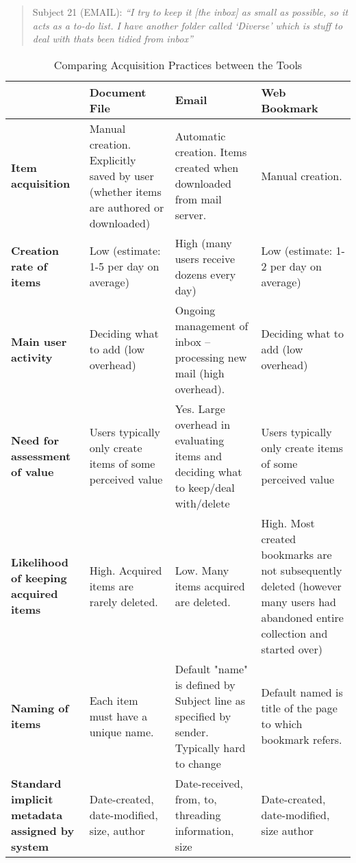 \begin{quote}
	Subject 21 (EMAIL): \textit{``I try to keep it [the inbox] as small as possible, so it acts as a to-do list. I have another folder called `Diverse' which is stuff to deal with thats been tidied from inbox''}
\end{quote}

\begin{table}[h]
\begin{center}
\begin{footnotesize}
\begin{tabular}{|p{2.5cm}|p{3.5cm}|p{3.5cm}|p{3.5cm}|}
\hline
    {\bf } & {\bf Document File} & {\bf Email} & {\bf Web Bookmark} \\
\hline \hline
{\bf Item acquisition} & Manual creation. Explicitly saved by user (whether items are authored or downloaded) & Automatic creation. Items created when downloaded from mail server.  & Manual creation. \\
\hline
{\bf Creation rate of items} & Low  (estimate: 1-5 per day on average) & High (many users receive dozens every day) & Low (estimate: 1-2 per day on average) \\
\hline
{\bf Main user activity} & Deciding what to add (low overhead) & Ongoing management of inbox --processing new mail (high overhead).  & Deciding what to add (low overhead) \\
\hline
{\bf Need for assessment of value} & Users typically only create items of some perceived value & Yes. Large overhead in evaluating items and deciding what to keep/deal with/delete & Users typically only create items of some perceived value \\
\hline
{\bf Likelihood of keeping acquired items} & High.  Acquired items are rarely deleted. & Low. Many items acquired are deleted. & High. Most created bookmarks are not subsequently deleted (however many users had abandoned entire collection and started over) \\
\hline
{\bf Naming of items} & Each item must have a unique name. & Default "name" is defined by Subject line as specified by sender. Typically hard to change & Default named is title of the page to which bookmark refers. \\
\hline
{\bf Standard implicit metadata assigned by system} & Date-created, date-modified, size, author & Date-received, from, to, threading information, size & Date-created, date-modified, size author \\
\hline
\end{tabular}  
\end{footnotesize}
\caption{Comparing Acquisition Practices between the Tools}
\label{table:chapter3_acquisition_strategy}
\end{center}
\end{table}





